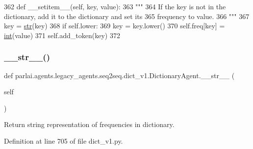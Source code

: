 \begin{DoxyCode}
362     \textcolor{keyword}{def }\_\_setitem\_\_(self, key, value):
363         \textcolor{stringliteral}{"""}
364 \textcolor{stringliteral}{        If the key is not in the dictionary, add it to the dictionary and set its}
365 \textcolor{stringliteral}{        frequency to value.}
366 \textcolor{stringliteral}{        """}
367         key = \hyperlink{namespacegenerate__task__READMEs_a5b88452ffb87b78c8c85ececebafc09f}{str}(key)
368         \textcolor{keywordflow}{if} self.lower:
369             key = key.lower()
370         self.freq[key] = \hyperlink{namespacelanguage__model_1_1eval__ppl_a7d12ee00479673c5c8d1f6d01faa272a}{int}(value)
371         self.add\_token(key)
372 
\end{DoxyCode}
\mbox{\label{classparlai_1_1agents_1_1legacy__agents_1_1seq2seq_1_1dict__v1_1_1DictionaryAgent_aaf643731fb8c436d729c5dc97c10c758}} 
\subsubsection{\texorpdfstring{\+\_\+\+\_\+str\+\_\+\+\_\+()}{\_\_str\_\_()}}
{\footnotesize\ttfamily def parlai.\+agents.\+legacy\+\_\+agents.\+seq2seq.\+dict\+\_\+v1.\+Dictionary\+Agent.\+\_\+\+\_\+str\+\_\+\+\_\+ (\begin{DoxyParamCaption}\item[{}]{self }\end{DoxyParamCaption})}

\begin{DoxyVerb}Return string representation of frequencies in dictionary.
\end{DoxyVerb}
 

Definition at line 705 of file dict\+\_\+v1.\+py.


